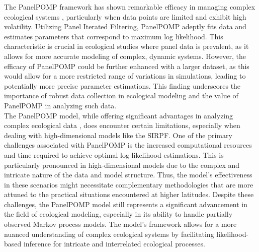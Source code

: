 \documentclass[12pt]{article}
\begin{document}
The PanelPOMP framework has shown remarkable efficacy in managing complex ecological systems \cite{Carles2020}, particularly when data points are limited and exhibit high volatility. Utilizing Panel Iterated Filtering, PanelPOMP adeptly fits data and estimates parameters that correspond to maximum log likelihood. This characteristic is crucial in ecological studies where panel data is prevalent, as it allows for more accurate modeling of complex, dynamic systems. However, the efficacy of PanelPOMP could be further enhanced with a larger dataset, as this would allow for a more restricted range of variations in simulations, leading to potentially more precise parameter estimations. This finding underscores the importance of robust data collection in ecological modeling and the value of PanelPOMP in analyzing such data.\\

The PanelPOMP model, while offering significant advantages in analyzing complex ecological data \cite{Carles2020}, does encounter certain limitations, especially when dealing with high-dimensional models like the SIRPF. One of the primary challenges associated with PanelPOMP is the increased computational resources and time required to achieve optimal log likelihood estimations. This is particularly pronounced in high-dimensional models due to the complex and intricate nature of the data and model structure. Thus, the model's effectiveness in these scenarios might necessitate complementary methodologies that are more attuned to the practical situations encountered at higher latitudes. Despite these challenges, the PanelPOMP model still represents a significant advancement in the field of ecological modeling, especially in its ability to handle partially observed Markov process models. The model's framework allows for a more nuanced understanding of complex ecological systems by facilitating likelihood-based inference for intricate and interrelated ecological processes.\\




\end{document}
